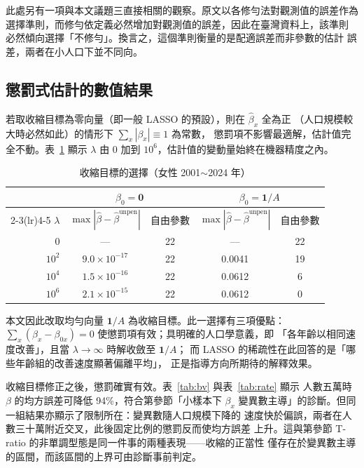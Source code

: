\documentclass[UTF8, fontset=macnew, a4paper, 12pt]{ctexart}
\begin{document}
此處另有一項與本文議題三直接相關的觀察。原文以各修勻法對觀測值的誤差作為
選擇準則，而修勻依定義必然增加對觀測值的誤差，因此在臺灣資料上，該準則
必然傾向選擇「不修勻」。換言之，這個準則衡量的是配適誤差而非參數的估計
誤差，兩者在小人口下並不同向。

\subsection{懲罰式估計的數值結果}

若取收縮目標為零向量（即一般 LASSO 的預設），則在 $\hat\beta_x$ 全為正
（人口規模較大時必然如此）的情形下 $\sum_x|\beta_x|\equiv1$ 為常數，
懲罰項不影響最適解，估計值完全不動。表~\ref{tab:shrink} 顯示 $\lambda$ 由
0 加到 $10^6$，估計值的變動量始終在機器精度之內。

\begin{table}[H]
\centering
\caption{收縮目標的選擇（女性 2001$\sim$2024 年）}
\small
\begin{tabular}{rcccc}
\toprule
& \multicolumn{2}{c}{$\beta_0=\mathbf{0}$} & \multicolumn{2}{c}{$\beta_0=\mathbf{1}/A$}\\
\cmidrule(lr){2-3}\cmidrule(lr){4-5}
$\lambda$ & $\max|\hat\beta-\hat\beta^{\text{unpen}}|$ & 自由參數 &
            $\max|\hat\beta-\hat\beta^{\text{unpen}}|$ & 自由參數\\
\midrule
$0$      & --- & 22 & --- & 22\\
$10^2$   & $9.0\times10^{-17}$ & 22 & 0.0041 & 19\\
$10^4$   & $1.5\times10^{-16}$ & 22 & 0.0612 & 6\\
$10^6$   & $2.1\times10^{-15}$ & 22 & 0.0612 & 0\\
\bottomrule
\end{tabular}
\label{tab:shrink}
\end{table}

本文因此改取均勻向量 $\mathbf{1}/A$ 為收縮目標。此一選擇有三項優點：
$\sum_x(\beta_x-\beta_{0x})=0$ 使懲罰項有效；具明確的人口學意義，即
「各年齡以相同速度改善」，且當 $\lambda\to\infty$ 時解收斂至 $\mathbf{1}/A$；
而 LASSO 的稀疏性在此回答的是「哪些年齡組的改善速度顯著偏離平均」，
正是指導方向所期待的解釋效果。

收縮目標修正之後，懲罰確實有效。表~\ref{tab:bv} 與表~\ref{tab:rate} 顯示
人數五萬時 $\beta$ 的均方誤差可降低 94\%，符合第參節「小樣本下 $\beta_x$
變異數主導」的診斷。但同一組結果亦顯示了限制所在：變異數隨人口規模下降的
速度快於偏誤，兩者在人數三十萬附近交叉，此後固定比例的懲罰反而使均方誤差
上升。這與第參節 T-ratio 的非單調型態是同一件事的兩種表現——收縮的正當性
僅存在於變異數主導的區間，而該區間的上界可由診斷事前判定。
\end{document}

